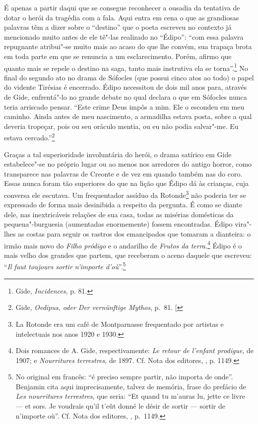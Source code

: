 É apenas a partir daqui que se consegue reconhecer a ousadia da
tentativa de dotar o herói da tragédia com a fala. Aqui entra em cena o
que as grandiosas palavras têm a dizer sobre o ``destino'' que o poeta
escreveu no contexto já mencionado muito antes de ele tê"-las realizado
no ``Édipo'': ``com essa palavra repugnante atribui"-se muito mais ao
acaso do que lhe convém, sua trapaça brota em toda parte em que se
renuncia a um esclarecimento. Porém, afirmo que quanto mais se repele o
destino na saga, tanto mais instrutiva ela se torna''.\footnote{Gide, \emph{Incidences}, p. 81. \versal{[N. T.]}} No final do segundo ato no drama de %
Sófocles (que possui cinco atos ao todo) o papel do vidente Tirésias é
encerrado. Édipo necessitou de dois mil anos para, através de Gide,
enfrentá"-lo no grande debate no qual declara o que em Sófocles nunca
teria arriscado pensar. ``Este crime Deus impôs a mim. Ele o escondeu em
meu caminho. Ainda antes de meu nascimento, a armadilha estava posta,
sobre a qual deveria tropeçar, pois ou seu oráculo mentia, ou eu não
podia salvar"-me. Eu estava cercado.''\footnote{Gide, \emph{Oedipus, oder Der vernünftige Mythos}, p.~81. {[}\versal{N. T.}{]}}

Graças a tal superioridade involuntária do herói, o drama satírico em
Gide estabelece"-se no próprio lugar ou ao menos nos arredores do antigo
horror, como transparece nas palavras de Creonte e de vez em quando
também nas do coro. Essas nunca foram tão superiores do que na lição que
Édipo dá às crianças, cuja conversa ele escutava. Um frequentador
assíduo da Rotonde\footnote{La Rotonde era um café de Montparnasse
  frequentado por artistas e intelectuais nos anos 1920 e 1930. \versal{[N. E.]}} não
poderia ter se expressado de forma mais desinibida a respeito da
pergunta. É como se diante dele, nas inextricáveis relações de sua
casa, todas as misérias domésticas da pequena"-burguesia (aumentadas
enormemente) fossem encontradas. Édipo vira"-lhes as costas para seguir
os rastros dos emancipados que tomaram a dianteira: o irmão mais novo do
\emph{Filho pródigo} e o andarilho de \emph{Frutos da terra}.\footnote{Dois romances de A. Gide, respectivamente: \emph{Le retour de l'enfant
  prodigue}, de 1907; e \emph{Nourritures terrestres}, de 1897. Cf. Nota
  dos editores, , p. 1149. \versal{[N. E.]}} Édipo é o
mais velho dos grandes que partem, que receberam o aceno daquele que
escreveu: ``\emph{Il faut toujours sortir n'importe d'où}''.\footnote{No original em francês: ``é preciso sempre partir, não importa de onde''.
  Benjamin cita aqui imprecisamente, talvez de memória, frase do
  prefácio de \emph{Les nourritures terrestres}, que seria: ``Et quand
  tu m'auras lu, jette ce livre --- et sors. Je voudrais qu'il t'eût
  donné le désir de sortir --- sortir de n'importe où''. Cf. Nota dos
  editores, , p.~1149. \versal{[N. T.]}}
